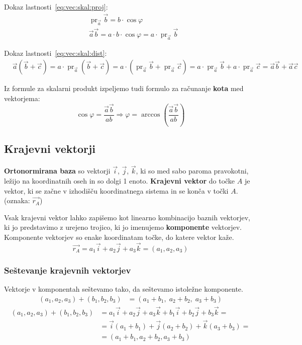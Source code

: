\documentclass[a4paper,oneside,12pt,fleqn]{article}
\newcommand\krat\cdot
\newcommand{\pr}{\ensuremath{\operatorname{pr}}} %
\def\kos{\cos}
\def\Vec{\overrightarrow}
\renewcommand\implies\Rightarrow
\numberwithin{equation}{section}
\begin{document}
Dokaz lastnosti~\ref{eq:vec:skal:proj}:
\begin{align*}
  &\pr_{\vec{a}}\vec{b} = b\krat\kos\varphi \\
  &\vec{a}\vec{b} = a\krat b\krat\kos\varphi = a \krat\pr_{\vec{a}}\vec{b}
\end{align*}

Dokaz lastnosti~\ref{eq:vec:skal:dist}:
\begin{align*}
  &\vec{a}(\vec{b} + \vec{c}) = a\krat\pr_{\vec{a}}(\vec{b}+\vec{c}) =
  a\krat(\pr_{\vec{a}}\vec{b} + \pr_{\vec{a}}\vec{c}) = 
  a\krat\pr_{\vec{a}}\vec{b} + a\krat\pr_{\vec{a}}\vec{c} = \vec{a}\vec{b} +
  \vec{a}\vec{c}
\end{align*}

Iz formule za skalarni produkt izpeljemo tudi formulo za računanje \textbf{kota} med vektorjema:
\[ \kos\varphi = \frac{\vec{a}\vec{b}}{ab} \implies \varphi = \arccos\left( 
\frac{\vec{a}\vec{b}}{ab} \right) \]

\subsection{Krajevni vektorji}
\label{sec:vec:kraj}
\textbf{Ortonormirana baza} so vektorji $\vec{i}$, $\vec{j}$, $\vec{k}$,
ki so med sabo paroma pravokotni, ležijo na koordinatnih oseh in so dolgi 1 enoto.
\textbf{Krajevni vektor} do točke $A$ je vektor, ki se začne v izhodišču koordinatnega sistema in se
konča v točki $A$. (oznaka: $\Vec{r_A}$)

Vsak krajevni vektor lahko zapišemo kot linearno kombinacijo baznih vektorjev, ki jo
predstavimo z urejeno trojico, ki jo imenujemo \textbf{komponente} vektorjev. 
Komponente vektorjev so enake koordinatam točke, do katere vektor kaže.
\[ \Vec{r_A} = a_1\vec{i} + a_2\vec{j} + a_3\vec{k} = (a_1,a_2,a_3) \]

\subsubsection{Seštevanje krajevnih vektorjev}
\label{sec:vec:kraj:sest}
Vektorje v komponentah seštevamo tako, da seštevamo istoležne komponente.
\boldmath
\begin{align*}
  (a_1,a_2,a_3) + (b_1,b_2,b_3) &=  (a_1+b_1,\;a_2+b_2,\;a_3+b_3)
\end{align*}
\unboldmath
\begin{align*}
  (a_1,a_2,a_3) + (b_1,b_2,b_3) &=  a_1\vec{i} + a_2\vec{j} + a_3\vec{k} + b_1\vec{i} +
  b_2\vec{j} + b_3\vec{k}=\\ &= 
  \vec{i}(a_1 + b_1) + \vec{j}(a_2+b_2) + \vec{k}(a_3+b_3) =\\&=  (a_1+b_1,a_2+b_2,a_3+b_3)
\end{align*}
\end{document}
